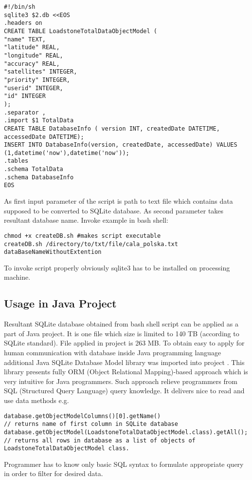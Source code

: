 \begin{lstlisting}[style=BASH]	
#!/bin/sh
sqlite3 $2.db <<EOS
.headers on
CREATE TABLE LoadstoneTotalDataObjectModel (
"name" TEXT,
"latitude" REAL,
"longitude" REAL,
"accuracy" REAL,
"satellites" INTEGER,
"priority" INTEGER,
"userid" INTEGER,
"id" INTEGER
);
.separator ,
.import $1 TotalData
CREATE TABLE DatabaseInfo ( version INT, createdDate DATETIME, accessedDate DATETIME);
INSERT INTO DatabaseInfo(version, createdDate, accessedDate) VALUES (1,datetime('now'),datetime('now'));
.tables
.schema TotalData
.schema DatabaseInfo
EOS
\end{lstlisting}

As first input parameter of the script is path to text file which contains data supposed to be converted to SQLite database. As second parameter takes resultant database name. Invoke example in bash shell:
\begin{lstlisting}[style=BASH]
chmod +x createDB.sh #makes script executable
createDB.sh /directory/to/txt/file/cala_polska.txt dataBaseNameWithoutExtention
\end{lstlisting}
To invoke script properly obviously sqlite3 has to be installed on processing machine. 

\subsection{Usage in Java Project}
Resultant SQLite database obtained from bash shell script can be applied as a part of Java project. It is one file which size is limited to 140 TB (according to SQLite standard). File applied in project is 263 MB. To obtain easy to apply for human communication with database inside Java programming language additional Java SQLite Database Model library was imported into project \cite{31}. This library presents fully ORM (Object Relational Mapping)-based approach which is very intuitive for Java programmers. Such approach relieve programmers from SQL (Structured Query Language) query knowledge. It delivers nice to read and use data methods e.g.
\begin{lstlisting}[style=JAVA]
database.getObjectModelColumns()[0].getName()
// returns name of first column in SQLite database
database.getObjectModel(LoadstoneTotalDataObjectModel.class).getAll();
// returns all rows in database as a list of objects of LoadstoneTotalDataObjectModel class.
\end{lstlisting}
Programmer has to know only basic SQL syntax to formulate appropriate query in order to filter for desired data.
